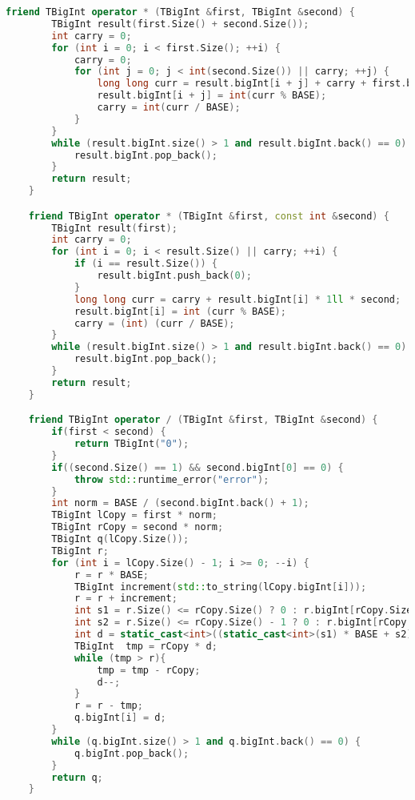 \begin{lstlisting}[language=C++]
    friend TBigInt operator * (TBigInt &first, TBigInt &second) {
        TBigInt result(first.Size() + second.Size());
        int carry = 0;
        for (int i = 0; i < first.Size(); ++i) {
            carry = 0;
            for (int j = 0; j < int(second.Size()) || carry; ++j) {
                long long curr = result.bigInt[i + j] + carry + first.bigInt[i] * 1ll * (j < (int)second.Size() ? second.bigInt[j] : 0);
                result.bigInt[i + j] = int(curr % BASE);
                carry = int(curr / BASE);
            }
        }
        while (result.bigInt.size() > 1 and result.bigInt.back() == 0) {
            result.bigInt.pop_back();
        }
        return result;
    }

    friend TBigInt operator * (TBigInt &first, const int &second) {
        TBigInt result(first);
        int carry = 0;
        for (int i = 0; i < result.Size() || carry; ++i) {
            if (i == result.Size()) {
                result.bigInt.push_back(0);
            }
            long long curr = carry + result.bigInt[i] * 1ll * second;
            result.bigInt[i] = int (curr % BASE);
            carry = (int) (curr / BASE);
        }
        while (result.bigInt.size() > 1 and result.bigInt.back() == 0) {
            result.bigInt.pop_back();
        }
        return result;
    }

    friend TBigInt operator / (TBigInt &first, TBigInt &second) {
        if(first < second) {
            return TBigInt("0");
        }
        if((second.Size() == 1) && second.bigInt[0] == 0) {
            throw std::runtime_error("error");
        }
        int norm = BASE / (second.bigInt.back() + 1);
        TBigInt lCopy = first * norm;
        TBigInt rCopy = second * norm;
        TBigInt q(lCopy.Size());
        TBigInt r;
        for (int i = lCopy.Size() - 1; i >= 0; --i) {
            r = r * BASE;
            TBigInt increment(std::to_string(lCopy.bigInt[i]));
            r = r + increment;
            int s1 = r.Size() <= rCopy.Size() ? 0 : r.bigInt[rCopy.Size()];
            int s2 = r.Size() <= rCopy.Size() - 1 ? 0 : r.bigInt[rCopy.Size() - 1];
            int d = static_cast<int>((static_cast<int>(s1) * BASE + s2) / rCopy.bigInt.back());
            TBigInt  tmp = rCopy * d;
            while (tmp > r){
                tmp = tmp - rCopy;
                d--;
            }
            r = r - tmp;
            q.bigInt[i] = d;
        }
        while (q.bigInt.size() > 1 and q.bigInt.back() == 0) {
            q.bigInt.pop_back();
        }
        return q;
    }


\end{lstlisting}
